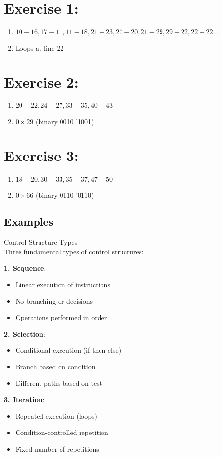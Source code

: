 \section*{Exercise 1:}
\begin{enumerate}
  \item $10-16,17-11,11-18,21-23,27-20,21-29,29-22,22-22 \ldots$
  \item Loops at line 22
\end{enumerate}

\section*{Exercise 2:}
\begin{enumerate}
  \item $20-22,24-27,33-35,40-43$
  \item $0 \times 29$ (binary 0010 '1001)
\end{enumerate}

\section*{Exercise 3:}
\begin{enumerate}
  \item $18-20,30-33,35-37,47-50$
  \item $0 \times 66$ (binary 0110 '0110)
\end{enumerate}

\subsection{Examples}

\begin{concept}{Control Structure Types}\\
Three fundamental types of control structures:

\textbf{1. Sequence}:
\begin{itemize}
  \item Linear execution of instructions
  \item No branching or decisions
  \item Operations performed in order
\end{itemize}

\textbf{2. Selection}:
\begin{itemize}
  \item Conditional execution (if-then-else)
  \item Branch based on condition
  \item Different paths based on test
\end{itemize}

\textbf{3. Iteration}:
\begin{itemize}
  \item Repeated execution (loops)
  \item Condition-controlled repetition
  \item Fixed number of repetitions
\end{itemize}

\end{concept}

